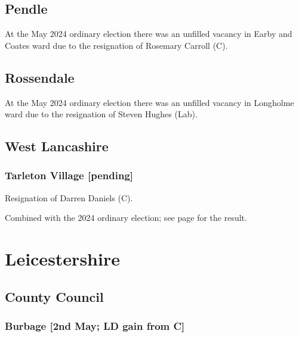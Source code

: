 \documentclass[a4paper,openany]{book}
\begin{document}
\begin{resultsiii}
\subsection*{Pendle}

At the May 2024 ordinary election there was an unfilled vacancy in Earby and Coates ward due to the resignation of Rosemary Carroll (C).%

\subsection*{Rossendale}

At the May 2024 ordinary election there was an unfilled vacancy in Longholme ward due to the resignation of Steven Hughes (Lab).%

\subsection*{West Lancashire}

\subsubsection*{Tarleton Village \hspace*{\fill}\nolinebreak[1]%
	\enspace\hspace*{\fill}
	[pending]}


Resignation of Darren Daniels (C).

Combined with the 2024 ordinary election; see page \pageref{TarletonVillageWLancs} for the result.

\section{Leicestershire}

\subsection*{County Council}

\subsubsection*{Burbage \hspace*{\fill}\nolinebreak[1]%
	\enspace\hspace*{\fill}
	[2nd May; LD gain from C]}


\end{resultsiii}
\end{document}
